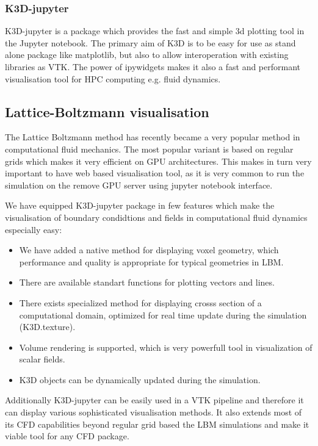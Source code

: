 \documentclass{deliverablereport}
\begin{document}
\subsubsection{K3D-jupyter}

K3D-jupyter is a package which provides the fast and simple 3d
plotting tool in the Jupyter notebook. The primary aim of K3D is to be
easy for use as stand alone package like matplotlib, but also to
allow interoperation with existing libraries as VTK. The power of
ipywidgets makes it also a fast and performant visualisation tool for
HPC computing e.g. fluid dynamics.


\subsection{Lattice-Boltzmann visualisation}

The Lattice Boltzmann method has recently became a very popular method
in computational fluid mechanics. The most popular variant is based on
regular grids which makes it very efficient on GPU architectures. This
makes in turn very important to have web based visualisation tool, as
it is very common to run the simulation on the remove GPU server using
jupyter notebook interface.

We have equipped K3D-jupyter package in few features which make the
visualisation of boundary condidtions and fields in computational
fluid dynamics especially easy:

\begin{itemize}
\item We have added a native method for displaying voxel geometry,
  which performance and quality is appropriate for typical geometries
  in LBM.
\item There are available standart functions for plotting vectors and lines.
\item There exists specialized method for displaying crosss section of
  a computational domain, optimized for real time update during the
  simulation (K3D.texture).
\item Volume rendering is supported, which is very powerfull tool in
  visualization of scalar fields.
\item K3D objects can be dynamically updated during the simulation.
\end{itemize}

Additionally K3D-jupyter can be easily used in a VTK pipeline and
therefore it can display various sophisticated visualisation
methods. It also extends most of its CFD capabilities beyond regular
grid based the LBM simulations and make it viable tool for any CFD
package.
\end{document}
